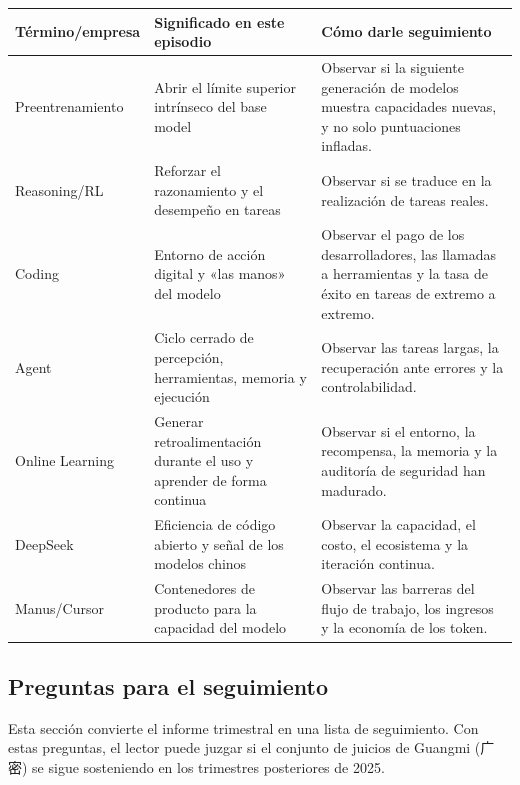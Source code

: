 \noindent\begin{tabularx}{\textwidth}{p{}p{}X}
\toprule
Término/empresa & Significado en este episodio & Cómo darle seguimiento \\
\midrule
Preentrenamiento & Abrir el límite superior intrínseco del base model & Observar si la siguiente generación de modelos muestra capacidades nuevas, y no solo puntuaciones infladas. \\
Reasoning/RL & Reforzar el razonamiento y el desempeño en tareas & Observar si se traduce en la realización de tareas reales. \\
Coding & Entorno de acción digital y «las manos» del modelo & Observar el pago de los desarrolladores, las llamadas a herramientas y la tasa de éxito en tareas de extremo a extremo. \\
Agent & Ciclo cerrado de percepción, herramientas, memoria y ejecución & Observar las tareas largas, la recuperación ante errores y la controlabilidad. \\
Online Learning & Generar retroalimentación durante el uso y aprender de forma continua & Observar si el entorno, la recompensa, la memoria y la auditoría de seguridad han madurado. \\
DeepSeek & Eficiencia de código abierto y señal de los modelos chinos & Observar la capacidad, el costo, el ecosistema y la iteración continua. \\
Manus/Cursor & Contenedores de producto para la capacidad del modelo & Observar las barreras del flujo de trabajo, los ingresos y la economía de los token. \\
\bottomrule
\end{tabularx}

\subsection{Preguntas para el seguimiento}

Esta sección convierte el informe trimestral en una lista de seguimiento. Con estas preguntas, el lector puede juzgar si el conjunto de juicios de Guangmi (广密) se sigue sosteniendo en los trimestres posteriores de 2025.

